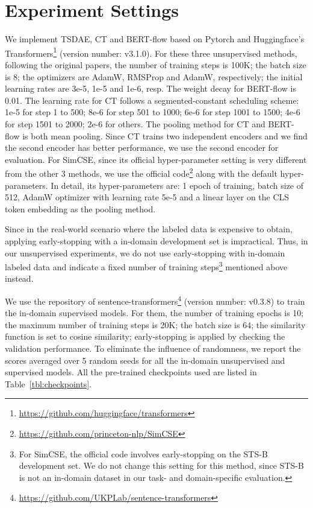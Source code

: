 \documentclass[11pt]{article}
\begin{document}
\section{Experiment Settings}
\label{sec:experiment_settings}
We implement TSDAE, CT and BERT-flow based on Pytorch and Huggingface's Transformers\footnote{\url{https://github.com/huggingface/transformers}} (version number: v3.1.0). For these three unsupervised methods, following the original papers, the number of training steps is 100K; the batch size is 8; the optimizers are AdamW, RMSProp and AdamW, respectively; the initial learning rates are 3e-5, 1e-5 and 1e-6, resp. The weight decay for BERT-flow is 0.01. The learning rate for CT follows a segmented-constant scheduling scheme: 1e-5 for step 1 to 500; 8e-6 for step 501 to 1000; 6e-6 for step 1001 to 1500; 4e-6 for step 1501 to 2000; 2e-6 for others. The pooling method for CT and BERT-flow is both mean pooling. Since CT trains two independent encoders and we find the second encoder has better performance, we use the second encoder for evaluation. For SimCSE, since its official hyper-parameter setting is very different from the other 3 methods, we use the official code\footnote{\url{https://github.com/princeton-nlp/SimCSE}} along with the default hyper-parameters. In detail, its hyper-parameters are: 1 epoch of training, batch size of 512, AdamW optimizer with learning rate 5e-5 and a linear layer on the CLS token embedding as the pooling method.

Since in the real-world scenario where the labeled data is expensive to obtain, applying early-stopping with a in-domain development set is impractical. Thus, in our unsupervised experiments, we do not use early-stopping with in-domain labeled data and indicate a fixed number of training steps\footnote{For SimCSE, the official code involves early-stopping on the STS-B development set. We do not change this setting for this method, since STS-B is not an in-domain dataset in our task- and domain-specific evaluation.} mentioned above instead.

We use the repository of sentence-transformers\footnote{\url{https://github.com/UKPLab/sentence-transformers}} (version number: v0.3.8) to train the in-domain supervised models. For them, the number of training epochs is 10; the maximum number of training steps is 20K; the batch size is 64; the similarity function  is set to cosine similarity; early-stopping is applied by checking the validation performance. To eliminate the influence of randomness, we report the scores averaged over 5 random seeds for all the in-domain unsupervised and supervised models. All the pre-trained checkpoints used are listed in Table~\ref{tbl:checkpoints}.
\end{document}
